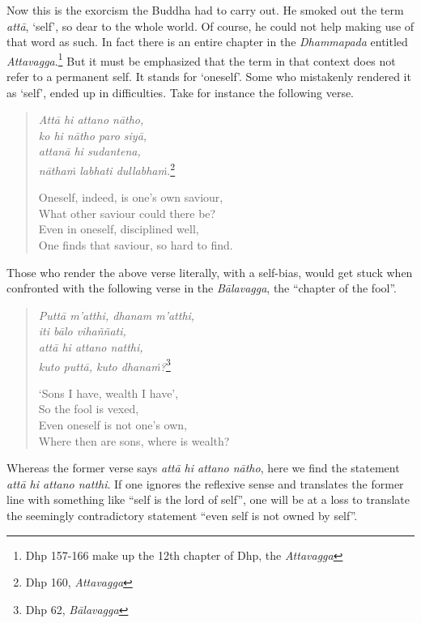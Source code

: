 Now this is the exorcism the Buddha had to carry out. He smoked out the term \emph{attā}, `self', so dear to the whole world. Of course, he could not help making use of that word as such. In fact there is an entire chapter in the \emph{Dhammapada} entitled \emph{Attavagga}.\footnote{Dhp 157-166 make up the 12th chapter of Dhp, the \emph{Attavagga}} But it must be emphasized that the term in that context does not refer to a permanent self. It stands for `oneself'. Some who mistakenly rendered it as `self', ended up in difficulties. Take for instance the following verse.

\begin{quote}
\emph{Attā hi attano nātho,}\\
\emph{ko hi nātho paro siyā,}\\
\emph{attanā hi sudantena,}\\
\emph{nāthaṁ labhati dullabhaṁ.}\footnote{Dhp 160, \emph{Attavagga}}

Oneself, indeed, is one's own saviour,\\
What other saviour could there be?\\
Even in oneself, disciplined well,\\
One finds that saviour, so hard to find.
\end{quote}

Those who render the above verse literally, with a self-bias, would get stuck when confronted with the following verse in the \emph{Bālavagga}, the ``chapter of the fool''.

\begin{quote}
\emph{Puttā m'atthi, dhanam m'atthi,}\\
\emph{iti bālo vihaññati,}\\
\emph{attā hi attano natthi,}\\
\emph{kuto puttā, kuto dhanaṁ?}\footnote{Dhp 62, \emph{Bālavagga}}

`Sons I have, wealth I have',\\
So the fool is vexed,\\
Even oneself is not one's own,\\
Where then are sons, where is wealth?
\end{quote}

Whereas the former verse says \emph{attā hi attano nātho}, here we find the statement \emph{attā hi attano natthi}. If one ignores the reflexive sense and translates the former line with something like ``self is the lord of self'', one will be at a loss to translate the seemingly contradictory statement ``even self is not owned by self''.

